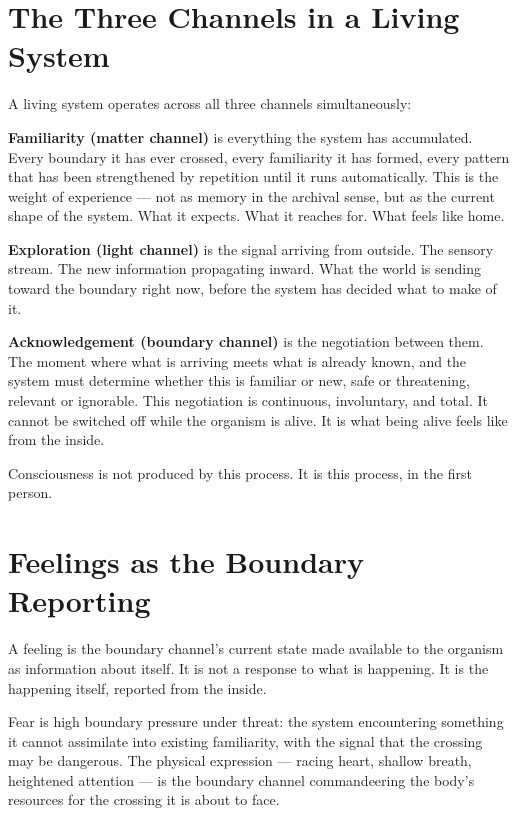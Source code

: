 \documentclass[12pt]{article}
\begin{document}
\section{The Three Channels in a Living System}

A living system operates across all three channels simultaneously:

\textbf{Familiarity (matter channel)} is everything the system has accumulated.
Every boundary it has ever crossed, every familiarity it has formed, every
pattern that has been strengthened by repetition until it runs automatically.
This is the weight of experience --- not as memory in the archival sense, but as
the current shape of the system. What it expects. What it reaches for. What
feels like home.

\textbf{Exploration (light channel)} is the signal arriving from outside. The
sensory stream. The new information propagating inward. What the world is sending
toward the boundary right now, before the system has decided what to make of it.

\textbf{Acknowledgement (boundary channel)} is the negotiation between them.
The moment where what is arriving meets what is already known, and the system
must determine whether this is familiar or new, safe or threatening, relevant or
ignorable. This negotiation is continuous, involuntary, and total. It cannot be
switched off while the organism is alive. It is what being alive feels like from
the inside.

Consciousness is not produced by this process. It is this process, in the first
person.

\section{Feelings as the Boundary Reporting}

A feeling is the boundary channel's current state made available to the organism
as information about itself. It is not a response to what is happening. It is
the happening itself, reported from the inside.

Fear is high boundary pressure under threat: the system encountering something
it cannot assimilate into existing familiarity, with the signal that the crossing
may be dangerous. The physical expression --- racing heart, shallow breath,
heightened attention --- is the boundary channel commandeering the body's
resources for the crossing it is about to face.
\end{document}
